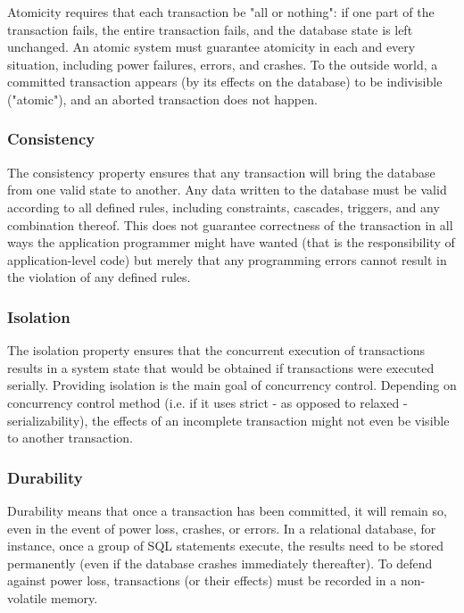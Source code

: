 Atomicity requires that each transaction be "all or nothing": 
if one part of the transaction fails, the entire transaction fails, and the database state is left unchanged. An atomic system must guarantee atomicity in each 
and every situation, including power failures, errors, and crashes. To the outside world, a committed transaction appears (by its effects on the database) to be 
indivisible ("atomic"), and an aborted transaction does not happen.

\subsubsection{Consistency}

The consistency property ensures that any transaction will bring the database from one valid state to another. Any data written to the database must be valid 
according to all defined rules, including constraints, cascades, triggers, and any combination thereof. This does not guarantee correctness of the transaction 
in all ways the application programmer might have wanted (that is the responsibility of application-level code) but merely that any programming errors cannot 
result in the violation of any defined rules.

\subsubsection{Isolation}

The isolation property ensures that the concurrent execution of transactions results in a system state that would be obtained if transactions were 
executed serially. Providing isolation is the main goal of concurrency control. Depending on concurrency control method 
(i.e. if it uses strict - as opposed to relaxed - serializability), the effects of an incomplete transaction might not even be visible to another transaction.

\subsubsection{Durability}

Durability means that once a transaction has been committed, it will remain so, even in the event of power loss, crashes, or errors. In a relational database, 
for instance, once a group of SQL statements execute, the results need to be stored permanently (even if the database crashes immediately thereafter). 
To defend against power loss, transactions (or their effects) must be recorded in a non-volatile memory.

